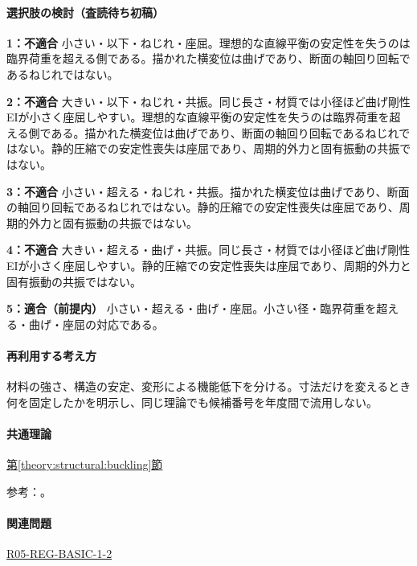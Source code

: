 \paragraph{選択肢の検討（査読待ち初稿）}\mbox{}\par

\noindent\textbf{1：不適合} 小さい・以下・ねじれ・座屈。理想的な直線平衡の安定性を失うのは臨界荷重を超える側である。描かれた横変位は曲げであり、断面の軸回り回転であるねじれではない。\par

\noindent\textbf{2：不適合} 大きい・以下・ねじれ・共振。同じ長さ・材質では小径ほど曲げ剛性EIが小さく座屈しやすい。理想的な直線平衡の安定性を失うのは臨界荷重を超える側である。描かれた横変位は曲げであり、断面の軸回り回転であるねじれではない。静的圧縮での安定性喪失は座屈であり、周期的外力と固有振動の共振ではない。\par

\noindent\textbf{3：不適合} 小さい・超える・ねじれ・共振。描かれた横変位は曲げであり、断面の軸回り回転であるねじれではない。静的圧縮での安定性喪失は座屈であり、周期的外力と固有振動の共振ではない。\par

\noindent\textbf{4：不適合} 大きい・超える・曲げ・共振。同じ長さ・材質では小径ほど曲げ剛性EIが小さく座屈しやすい。静的圧縮での安定性喪失は座屈であり、周期的外力と固有振動の共振ではない。\par

\noindent\textbf{5：適合（前提内）} 小さい・超える・曲げ・座屈。小さい径・臨界荷重を超える・曲げ・座屈の対応である。\par

\paragraph{再利用する考え方} 材料の強さ、構造の安定、変形による機能低下を分ける。寸法だけを変えるとき何を固定したかを明示し、同じ理論でも候補番号を年度間で流用しない。

\paragraph{共通理論} \hyperref[theory:structural:buckling]{第\ref*{theory:structural:buckling}節}

\par 参考：\cite{struct_mit_beam,struct_mit_buckling,struct_mlit_limit}。

\paragraph{関連問題} \hyperref[q:r05-reg-basic-1-2]{R05-REG-BASIC-1-2}

